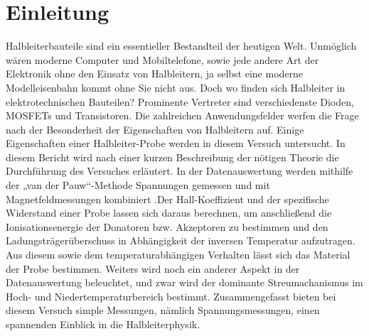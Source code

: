 \section{Einleitung}
Halbleiterbauteile sind ein essentieller Bestandteil der heutigen Welt. Unmöglich wären moderne Computer und Mobiltelefone, sowie jede andere Art der Elektronik ohne den Einsatz von Halbleitern, ja selbst eine moderne Modelleisenbahn kommt ohne Sie nicht aus. Doch wo finden sich Halbleiter in elektrotechnischen Bauteilen? Prominente Vertreter sind verschiedenste Dioden, MOSFETs und Transistoren. Die zahlreichen Anwendungsfelder werfen die Frage nach der Besonderheit der Eigenschaften von Halbleitern auf. Einige Eigenschaften einer Halbleiter-Probe werden in diesem Versuch untersucht. \newline
In diesem Bericht wird nach einer kurzen Beschreibung der nötigen Theorie die Durchführung des Versuches erläutert. In der Datenauswertung werden mithilfe der „van der Pauw“-Methode Spannungen gemessen und mit Magnetfeldmessungen kombiniert .Der Hall-Koeffizient und der spezifische Widerstand einer Probe lassen sich daraus berechnen, um anschließend die Ionisationsenergie der Donatoren bzw. Akzeptoren zu bestimmen und den Ladungsträgerüberschuss in Abhängigkeit der inversen Temperatur aufzutragen. Aus diesem sowie dem temperaturabhängigen Verhalten lässt sich das Material der Probe bestimmen. Weiters wird noch ein anderer Aspekt in der Datenauswertung beleuchtet, und zwar wird der dominante Streumachanismus im Hoch- und Niedertemperaturbereich bestimmt. Zusammengefasst bieten bei diesem Versuch simple Messungen, nämlich Spannungsmessungen, einen spannenden Einblick in die Halbleiterphysik.
